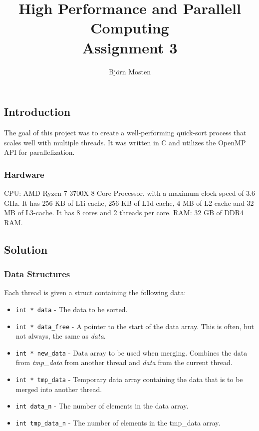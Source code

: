 \documentclass{report}
\title{\Huge{High Performance and Parallell Computing}\\Assignment 3}
\author{\huge{Björn Mosten}}
\date{}
\begin{document}
\maketitle
\newpage%
\tableofcontents
\pagebreak

\chapter{}
\setcounter{section}{1}
\section{Introduction}
The goal of this project was to create a well-performing quick-sort process that scales well with multiple threads.
It was written in C and utilizes the OpenMP API for parallelization.



\subsection{Hardware}
CPU: AMD Ryzen 7 3700X 8-Core Processor, with a maximum clock speed of 3.6 GHz. It has 256 KB of L1i-cache, 256 KB of L1d-cache, 4 MB of L2-cache and 32 MB of L3-cache. It has 8 cores and 2 threads per core.
RAM: 32 GB of DDR4 RAM.

\section{Solution}
\subsection{Data Structures}
Each thread is given a struct containing the following data:
\begin{itemize}
    \item \texttt{int * data} - The data to be sorted.
    \item \texttt{int * data\_free} - A pointer to the start of the data array. This is often, but not always, the same as \textit{data}.
    \item \texttt{int * new\_data} - Data array to be used when merging. Combines the data from \textit{tmp\_data} from another thread and 
        \textit{data} from the current thread.
    \item \texttt{int * tmp\_data} - Temporary data array containing the data that is to be merged into another thread.
    \item \texttt{int data\_n} - The number of elements in the data array.
    \item \texttt{int tmp\_data\_n} - The number of elements in the tmp\_data array.
\end{itemize}
\end{document}

